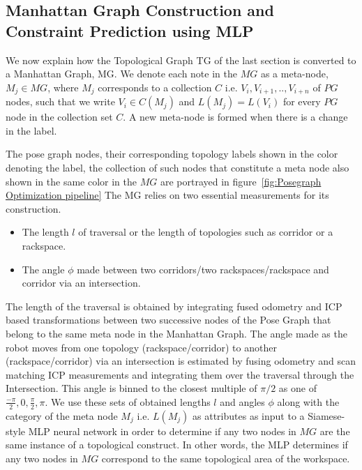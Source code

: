 \documentclass[letterpaper, 10 pt, conference]{ieeeconf}  %
\begin{document}
	\subsection{Manhattan Graph Construction and Constraint Prediction using MLP}
	\label{manhatten_construction}
	We now explain how the Topological Graph TG of the last section is converted to a Manhattan Graph, MG. We denote each note in the $MG$ as a meta-node, $M_{j} \in MG$, where $M_{j}$ corresponds to a collection $C$ i.e. $V_{i}, V_{i+1},.., V_{i+n}$ of $PG$ nodes, such that we write $V_{i} \in C(M_{j})$ and $L(M_{j}) = L(V_{i}) $ for every $PG$ node in the collection set $C$. A new meta-node is formed when there is a change in the label.
	
	The pose graph nodes, their corresponding topology labels shown in the color denoting the label, the collection of such nodes that constitute a meta node also shown in the same color in the $MG$ are portrayed in figure~\ref{fig:Posegraph Optimization pipeline}	
	The MG relies on two essential measurements for its construction. 
	\begin{itemize}
		\item The length $l$ of traversal or the length of topologies such as corridor or a rackspace.
		\item The angle $\phi$ made between two corridors/two rackspaces/rackspace and corridor via an intersection. 
	\end{itemize} 
	
	The length of the traversal is obtained by integrating fused odometry and ICP based transformations between two successive nodes of the Pose Graph that belong to the same meta node in the Manhattan Graph. The angle made as the robot moves from one topology (rackspace/corridor) to another (rackspace/corridor) via an intersection is estimated by fusing odometry and scan matching ICP measurements and integrating them over the traversal through the Intersection. This angle is binned to the closest multiple of $\pi/2$ as one of $\frac{-\pi}{2}, 0, \frac{\pi}{2}, \pi$. We use these sets of obtained lengths $l$ and angles $\phi$ along with the category of the meta node $M_{j}$ i.e. $L(M_{j})$ as attributes as input to a Siamese-style MLP neural network in order to determine if any two nodes in $MG$ are the same instance of a topological construct. In other words, the MLP determines if any two nodes in $MG$ correspond to the same topological area of the workspace. 
	
\end{document}

